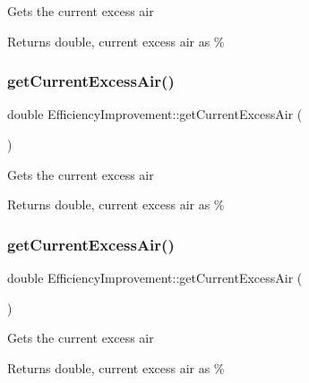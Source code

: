 Gets the current excess air

\begin{DoxyReturn}{Returns}
double, current excess air as \% 
\end{DoxyReturn}
\mbox{\label{class_efficiency_improvement_a42cd83e1c57f065077e31f21b3552a76}} 
\subsubsection{\texorpdfstring{get\+Current\+Excess\+Air()}{getCurrentExcessAir()}\hspace{0.1cm}{\footnotesize\ttfamily [2/3]}}
{\footnotesize\ttfamily double Efficiency\+Improvement\+::get\+Current\+Excess\+Air (\begin{DoxyParamCaption}{ }\end{DoxyParamCaption})}

Gets the current excess air

\begin{DoxyReturn}{Returns}
double, current excess air as \% 
\end{DoxyReturn}
\mbox{\label{class_efficiency_improvement_a42cd83e1c57f065077e31f21b3552a76}} 
\subsubsection{\texorpdfstring{get\+Current\+Excess\+Air()}{getCurrentExcessAir()}\hspace{0.1cm}{\footnotesize\ttfamily [3/3]}}
{\footnotesize\ttfamily double Efficiency\+Improvement\+::get\+Current\+Excess\+Air (\begin{DoxyParamCaption}{ }\end{DoxyParamCaption})}

Gets the current excess air

\begin{DoxyReturn}{Returns}
double, current excess air as \% 
\end{DoxyReturn}



